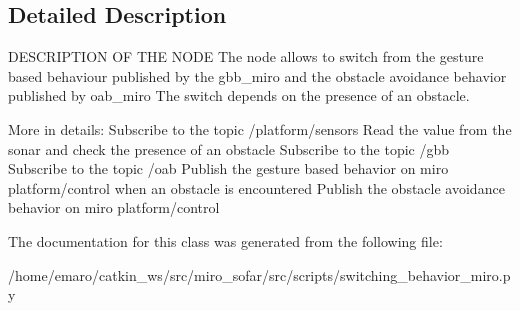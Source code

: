 \subsection{Detailed Description}
D\+E\+S\+C\+R\+I\+P\+T\+I\+ON OF T\+HE N\+O\+DE The node allows to switch from the gesture based behaviour published by the gbb\+\_\+miro and the obstacle avoidance behavior published by oab\+\_\+miro The switch depends on the presence of an obstacle. 

More in details\+: Subscribe to the topic /platform/sensors Read the value from the sonar and check the presence of an obstacle Subscribe to the topic /gbb Subscribe to the topic /oab Publish the gesture based behavior on miro platform/control when an obstacle is encountered Publish the obstacle avoidance behavior on miro platform/control 

The documentation for this class was generated from the following file\+:\begin{DoxyCompactItemize}
\item 
/home/emaro/catkin\+\_\+ws/src/miro\+\_\+sofar/src/scripts/switching\+\_\+behavior\+\_\+miro.\+py\end{DoxyCompactItemize}
